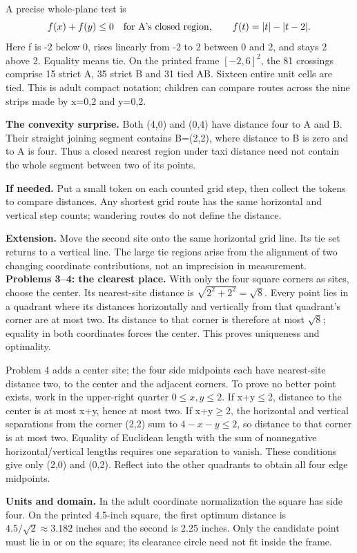 \documentclass[11pt]{article}
\begin{document}
A precise whole-plane test is
\[
f(x)+f(y)\leq0\quad\hbox{for A's closed region},\qquad
f(t)=|t|-|t-2|.
\]
Here f is -2 below 0, rises linearly from -2 to 2 between 0 and 2, and stays 2 above 2. Equality means tie. On the printed frame \([-2,6]^2\), the 81 crossings comprise 15 strict A, 35 strict B and 31 tied AB. Sixteen entire unit cells are tied. This is adult compact notation; children can compare routes across the nine strips made by x=0,2 and y=0,2.

\textbf{The convexity surprise.} Both (4,0) and (0,4) have distance four to A and B. Their straight joining segment contains B=(2,2), where distance to B is zero and to A is four. Thus a closed nearest region under taxi distance need not contain the whole segment between two of its points.

\textbf{If needed.} Put a small token on each counted grid step, then collect the tokens to compare distances. Any shortest grid route has the same horizontal and vertical step counts; wandering routes do not define the distance.

\textbf{Extension.} Move the second site onto the same horizontal grid line. Its tie set returns to a vertical line. The large tie regions arise from the alignment of two changing coordinate contributions, not an imprecision in measurement.
\newpage
\textbf{Problems 3--4: the clearest place.} With only the four square corners as sites, choose the center. Its nearest-site distance is \(\sqrt{2^2+2^2}=\sqrt8\). Every point lies in a quadrant where its distances horizontally and vertically from that quadrant's corner are at most two. Its distance to that corner is therefore at most \(\sqrt8\); equality in both coordinates forces the center. This proves uniqueness and optimality.

Problem 4 adds a center site; the four side midpoints each have nearest-site distance two, to the center and the adjacent corners. To prove no better point exists, work in the upper-right quarter \(0\leq x,y\leq2\). If x+y\(\leq\)2, distance to the center is at most x+y, hence at most two. If x+y\(\geq\)2, the horizontal and vertical separations from the corner (2,2) sum to \(4-x-y\leq2\), so distance to that corner is at most two. Equality of Euclidean length with the sum of nonnegative horizontal/vertical lengths requires one separation to vanish. These conditions give only (2,0) and (0,2). Reflect into the other quadrants to obtain all four edge midpoints.

\textbf{Units and domain.} In the adult coordinate normalization the square has side four. On the printed 4.5-inch square, the first optimum distance is \(4.5/\sqrt2\approx3.182\) inches and the second is 2.25 inches. Only the candidate point must lie in or on the square; its clearance circle need not fit inside the frame.
\end{document}
